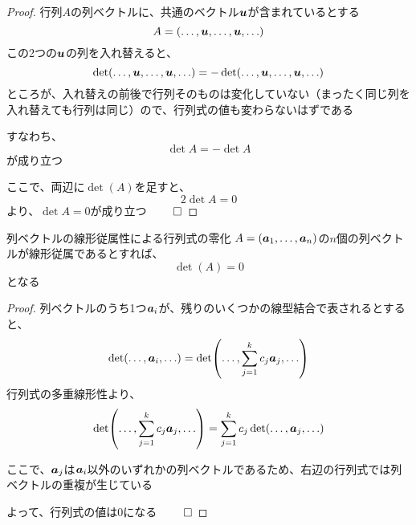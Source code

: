 \documentclass[../../../topic_linear-algebra]{subfiles}
\begin{document}
\begin{proof}
  行列$A$の列ベクトルに、共通のベクトル$\vb*{u}$が含まれているとする
  \begin{equation*}
    A = (\ldots, \vb*{u}, \ldots, \vb*{u}, \ldots)
  \end{equation*}
  この2つの$\vb*{u}$の列を入れ替えると、
  \begin{equation*}
    \det(\ldots, \vb*{u}, \ldots, \vb*{u}, \ldots) = -\det(\ldots, \vb*{u}, \ldots, \vb*{u}, \ldots)
  \end{equation*}
  ところが、入れ替えの前後で行列そのものは変化していない（まったく同じ列を入れ替えても行列は同じ）ので、行列式の値も変わらないはずである

  すなわち、
  \begin{equation*}
    \det A = -\det A
  \end{equation*}
  が成り立つ

  ここで、両辺に$\det(A)$を足すと、
  \begin{equation*}
    2\det A = 0
  \end{equation*}
  より、$\det A = 0$が成り立つ $\qed$
\end{proof}

\sectionline

\begin{theorem}{列ベクトルの線形従属性による行列式の零化}
  $A = (\vb*{a}_1, \ldots, \vb*{a}_n)$の$n$個の列ベクトルが線形従属であるとすれば、
  \begin{equation*}
    \det(A) = 0
  \end{equation*}
  となる
\end{theorem}

\begin{proof}
  列ベクトルのうち1つ$\vb*{a}_i$が、残りのいくつかの線型結合で表されるとすると、
  \begin{equation*}
    \det(\ldots, \vb*{a}_i, \ldots) = \det(\ldots, \sum_{j=1}^{k} c_j \vb*{a}_{j}, \ldots)
  \end{equation*}
  行列式の多重線形性より、
  \begin{equation*}
    \det(\ldots, \sum_{j=1}^{k} c_j \vb*{a}_{j}, \ldots) = \sum_{j=1}^{k} c_j \det(\ldots, \vb*{a}_{j}, \ldots)
  \end{equation*}

  \br

  ここで、$\vb*{a}_j$は$\vb*{a}_i$以外のいずれかの列ベクトルであるため、右辺の行列式では列ベクトルの重複が生じている

  よって、行列式の値は0になる $\qed$
\end{proof}
\end{document}
